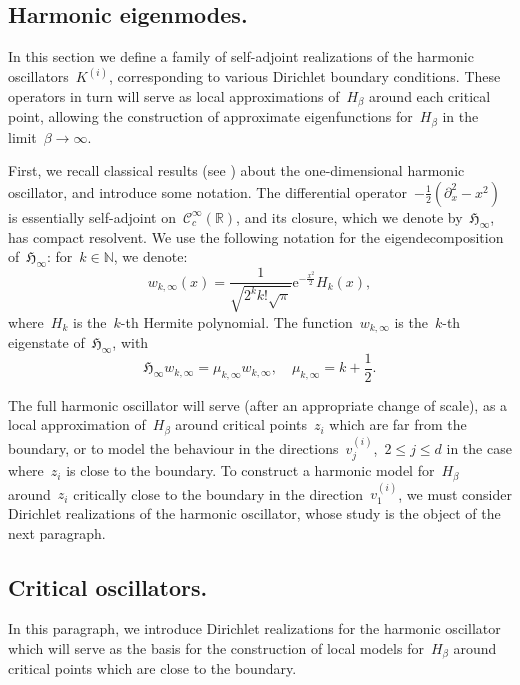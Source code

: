 \documentclass[10pt]{article}
\newcommand{\e}{\mathrm{e}}
\newcommand{\R}{\mathbb{R}}
\newcommand{\N}{\mathbb N}
\newcommand{\1}{\mathbbm 1}
\newcommand{\hessEigvec}[2]{v^{(#1)}_{#2}} %
\newcommand{\Ki}[1]{K^{(i)}_{#1}}
\begin{document}
    \subsection{Harmonic eigenmodes.}
    In this section we define a family of self-adjoint realizations of the harmonic oscillators~$\Ki{}$, corresponding to various Dirichlet boundary conditions. These operators in turn will serve as local approximations of~$H_\beta$ around each critical point, allowing the construction of approximate eigenfunctions for~$H_\beta$ in the limit~$\beta\to\infty$.

    First, we recall classical results (see \cite{}) about the one-dimensional harmonic oscillator, and introduce some notation.
    The differential operator~$-\frac12\left(\partial_x^2-x^2\right)$ is essentially self-adjoint on~$\mathcal C_c^\infty(\R)$, and its closure, which we denote by~${\mathfrak H}_{\infty}$, has compact resolvent.
    We use the following notation for the eigendecomposition of~${\mathfrak H}_\infty$: for~$k\in\N$, we denote:
    \begin{equation}
        \label{eq:hermite_eigenfunction}
        w_{k,\infty}(x) = \frac{1}{\sqrt{2^k k! \sqrt\pi}}\e^{-\frac{x^2}2}H_k(x),
    \end{equation}
    where~$H_k$ is the~$k$-th Hermite polynomial. The function~$w_{k,\infty}$ is the~$k$-th eigenstate of~${\mathfrak H}_\infty$, with
    \begin{equation}
        \label{eq:hermite_eigenproblem}
         \mathfrak{H}_{\infty}w_{k,\infty} = \mu_{k,\infty} w_{k,\infty},\quad \mu_{k,\infty} = k + \frac12.
    \end{equation}

    The full harmonic oscillator will serve (after an appropriate change of scale), as a local approximation of~$H_\beta$ around critical points~$z_i$ which are far from the boundary, or to model the behaviour in the directions~$\hessEigvec{i}{j}$,~$2\leq j \leq d$ in the case where~$z_i$ is close to the boundary.
    To construct a harmonic model for~$H_\beta$ around~$z_i$ critically close to the boundary in the direction~$\hessEigvec{i}{1}$, we must consider Dirichlet realizations of the harmonic oscillator, whose study is the object of the next paragraph.
    \subsection{Critical oscillators.}\label{subsec:critical_oscillators}
    In this paragraph, we introduce Dirichlet realizations for the harmonic oscillator which will serve as the basis for the construction of local models for~$H_\beta$ around critical points which are close to the boundary.
\end{document}
